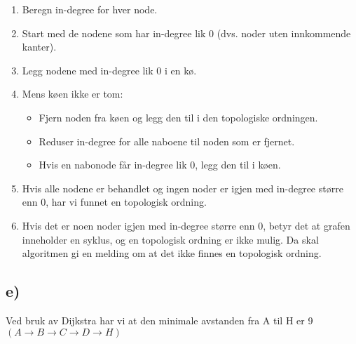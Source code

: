 \documentclass[12pt]{article}
\begin{document}
\begin{enumerate}
    \item Beregn in-degree for hver node.
    \item Start med de nodene som har in-degree lik 0 (dvs. noder uten innkommende kanter).
    \item Legg nodene med in-degree lik 0 i en kø.
    \item Mens køen ikke er tom:
    \begin{itemize}
        \item Fjern noden fra køen og legg den til i den topologiske ordningen.
        \item Reduser in-degree for alle naboene til noden som er fjernet.
        \item Hvis en nabonode får in-degree lik 0, legg den til i køen.
    \end{itemize}
    \item Hvis alle nodene er behandlet og ingen noder er igjen med in-degree større enn 0, har vi funnet en topologisk ordning.
    \item Hvis det er noen noder igjen med in-degree større enn 0, betyr det at grafen inneholder en syklus, og en topologisk ordning er ikke mulig. Da skal algoritmen gi en melding om at det ikke finnes en topologisk ordning.
\end{enumerate}

\break
\subsection*{e)}
Ved bruk av Dijkstra har vi at den minimale avstanden fra 
A til H er 9 \(\left(A\to B \to C \to D \to H\right)\)
\end{document}
